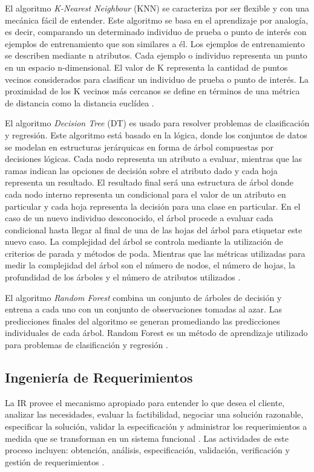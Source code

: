 \documentclass[journal]{IEEEtran}
\begin{document}
El algoritmo \textit{K-Nearest Neighbour} (KNN) se caracteriza por ser flexible y con una mecánica fácil de entender. Este algoritmo se basa en el aprendizaje por analogía, es decir, comparando un determinado individuo de prueba o punto de interés con ejemplos de entrenamiento que son similares a él. Los ejemplos de entrenamiento se describen mediante n atributos. Cada ejemplo o individuo representa un punto en un espacio n-dimensional. El valor de K representa la cantidad de puntos vecinos considerados para clasificar un individuo de prueba o  punto de interés. La proximidad de los K vecinos más cercanos se define en términos de una métrica de distancia como la distancia euclídea \cite{alpaydin2014introduction}.  

El algoritmo \textit{Decision Tree} (DT) es usado para resolver problemas de clasificación y regresión. Este algoritmo está basado en la lógica, donde los conjuntos de datos se modelan en estructuras jerárquicas en forma de árbol compuestas por decisiones lógicas. Cada nodo representa un atributo a evaluar, mientras que las ramas indican las opciones de decisión sobre el atributo dado y cada hoja representa un resultado. El resultado final será una estructura de árbol donde cada nodo interno representa un condicional para el valor de un atributo en particular y cada hoja representa la decisión para una clase en particular. En el caso de un nuevo individuo desconocido, el árbol procede a evaluar cada condicional hasta llegar al final de una de las hojas del árbol para etiquetar este nuevo caso. La complejidad del árbol se controla mediante la utilización de criterios de parada y métodos de  poda. Mientras que las métricas utilizadas para medir la complejidad del árbol son el número de nodos, el número de hojas, la profundidad de los árboles y el número de atributos utilizados \cite{rokach2005decision}. 

El algoritmo \textit{Random Forest} combina un conjunto de árboles de decisión y entrena a cada uno con un conjunto de observaciones tomadas al azar. Las predicciones finales del algoritmo se generan promediando las predicciones individuales de cada árbol.  Random Forest es un método de aprendizaje utilizado para problemas de clasificación y regresión \cite{williams2011random}. 

\subsection{Ingeniería de Requerimientos}

La IR provee el mecanismo apropiado para entender lo que desea el cliente, analizar las necesidades, evaluar la factibilidad, negociar una solución razonable, especificar la solución, validar la especificación y administrar los requerimientos a medida que se transforman en un sistema funcional \cite{thayer1997software}. Las actividades de este proceso incluyen: obtención, análisis, especificación, validación, verificación y gestión de requerimientos \cite{Pohl2010}.
\end{document}
